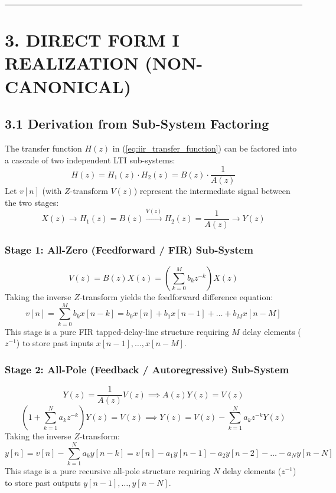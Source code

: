 \documentclass[11pt,a4paper]{article}
\begin{document}
\noindent\rule{\textwidth}{0.5pt}

\section{3. DIRECT FORM I REALIZATION (NON-CANONICAL)}

\subsection{3.1 Derivation from Sub-System Factoring}
The transfer function $H(z)$ in (\ref{eq:iir_transfer_function}) can be factored into a cascade of two independent LTI sub-systems:
\begin{equation}
H(z) = H_1(z) \cdot H_2(z) = B(z) \cdot \frac{1}{A(z)}
\end{equation}
Let $v[n]$ (with $Z$-transform $V(z)$) represent the intermediate signal between the two stages:
\begin{equation}
X(z) \longrightarrow \boxed{H_1(z) = B(z)} \xrightarrow{V(z)} \boxed{H_2(z) = \frac{1}{A(z)}} \longrightarrow Y(z)
\end{equation}

\subsubsection{Stage 1: All-Zero (Feedforward / FIR) Sub-System}
\begin{equation}
V(z) = B(z) X(z) = \left( \sum_{k=0}^{M} b_k z^{-k} \right) X(z)
\end{equation}
Taking the inverse $Z$-transform yields the feedforward difference equation:
\begin{equation}
v[n] = \sum_{k=0}^{M} b_k x[n-k] = b_0 x[n] + b_1 x[n-1] + \dots + b_M x[n-M]
\end{equation}
This stage is a pure FIR tapped-delay-line structure requiring $M$ delay elements ($z^{-1}$) to store past inputs $x[n-1], \dots, x[n-M]$.

\subsubsection{Stage 2: All-Pole (Feedback / Autoregressive) Sub-System}
\begin{equation}
Y(z) = \frac{1}{A(z)} V(z) \implies A(z) Y(z) = V(z)
\end{equation}
\begin{equation}
\left( 1 + \sum_{k=1}^{N} a_k z^{-k} \right) Y(z) = V(z) \implies Y(z) = V(z) - \sum_{k=1}^{N} a_k z^{-k} Y(z)
\end{equation}
Taking the inverse $Z$-transform:
\begin{equation}
y[n] = v[n] - \sum_{k=1}^{N} a_k y[n-k] = v[n] - a_1 y[n-1] - a_2 y[n-2] - \dots - a_N y[n-N]
\end{equation}
This stage is a pure recursive all-pole structure requiring $N$ delay elements ($z^{-1}$) to store past outputs $y[n-1], \dots, y[n-N]$.
\end{document}

